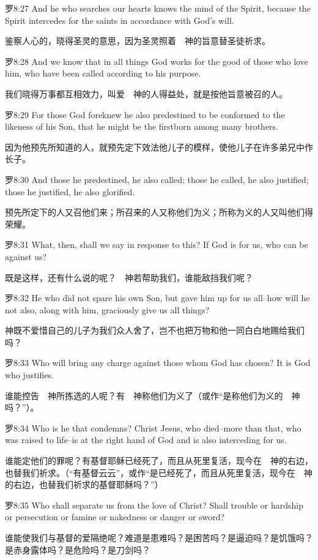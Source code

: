 \documentclass[a4paper,11pt,onecolumn,twoside]{ctexart}
\begin{document}
\begin{multicols}{2}
 罗8:27
 And he who searches our hearts knows the mind of the Spirit, because the Spirit intercedes for the saints in accordance with God's will.

 鉴察人心的，晓得圣灵的意思，因为圣灵照着　神的旨意替圣徒祈求。


 罗8:28
 And we know that in all things God works for the good of those who love him, who have been called according to his purpose.

 我们晓得万事都互相效力，叫爱　神的人得益处，就是按他旨意被召的人。


 罗8:29
 For those God foreknew he also predestined to be conformed to the likeness of his Son, that he might be the firstborn among many brothers.

 因为他预先所知道的人，就预先定下效法他儿子的模样，使他儿子在许多弟兄中作长子。


 罗8:30
 And those he predestined, he also called; those he called, he also justified; those he justified, he also glorified.

 预先所定下的人又召他们来；所召来的人又称他们为义；所称为义的人又叫他们得荣耀。


 罗8:31
 What, then, shall we say in response to this? If God is for us, who can be against us?

 既是这样，还有什么说的呢？　神若帮助我们，谁能敌挡我们呢？


 罗8:32
 He who did not spare his own Son, but gave him up for us all--how will he not also, along with him, graciously give us all things?

 神既不爱惜自己的儿子为我们众人舍了，岂不也把万物和他一同白白地赐给我们吗？


 罗8:33
 Who will bring any charge against those whom God has chosen? It is God who justifies.

 谁能控告　神所拣选的人呢？有　神称他们为义了（或作“是称他们为义的　神吗？”）。


 罗8:34
 Who is he that condemns? Christ Jesus, who died--more than that, who was raised to life--is at the right hand of God and is also interceding for us.

 谁能定他们的罪呢？有基督耶稣已经死了，而且从死里复活，现今在　神的右边，也替我们祈求。（“有基督云云”，或作“是已经死了，而且从死里复活，现今在　神的右边，也替我们祈求的基督耶稣吗？”）


 罗8:35
 Who shall separate us from the love of Christ? Shall trouble or hardship or persecution or famine or nakedness or danger or sword?

 谁能使我们与基督的爱隔绝呢？难道是患难吗？是困苦吗？是逼迫吗？是饥饿吗？是赤身露体吗？是危险吗？是刀剑吗？



\end{multicols}
\end{document}
